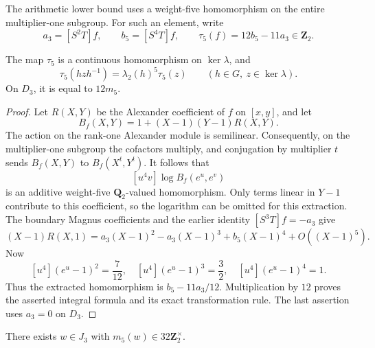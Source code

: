 The arithmetic lower bound uses a weight-five homomorphism on
the entire multiplier-one subgroup.  For such an element, write
\[
 a_3=[S^2T]f,\qquad b_5=[S^4T]f,
 \qquad \tau_5(f)=12b_5-11a_3\in\mathbf Z_2.
\]

\begin{lemma}\label{lem:tau-five}
The map $\tau_5$ is a continuous homomorphism on $\ker\lambda$,
and
\[
 \tau_5(hzh^{-1})=\lambda_2(h)^5\tau_5(z)
 \qquad(h\in G,\ z\in\ker\lambda).
\]
On $D_3$, it is equal to $12m_5$.
\end{lemma}

\begin{proof}
Let $R(X,Y)$ be the Alexander coefficient of $f$ on $[x,y]$,
and let
\[
 B_f(X,Y)=1+(X-1)(Y-1)R(X,Y).
\]
The action on the rank-one Alexander module is semilinear.
Consequently, on the multiplier-one subgroup the cofactors
multiply, and conjugation by multiplier $t$ sends $B_f(X,Y)$
to $B_f(X^t,Y^t)$.  It follows that
\[
 [u^4v]\log B_f(e^u,e^v)
\]
is an additive weight-five $\mathbf Q_2$-valued homomorphism.
Only terms linear in $Y-1$ contribute to this coefficient, so
the logarithm can be omitted for this extraction.  The boundary
Magnus coefficients and the earlier identity $[S^3T]f=-a_3$ give
\[
 (X-1)R(X,1)
 =a_3(X-1)^2-a_3(X-1)^3+b_5(X-1)^4+O((X-1)^5).
\]
Now
\[
 [u^4](e^u-1)^2=\frac7{12},\quad
 [u^4](e^u-1)^3=\frac32,\quad
 [u^4](e^u-1)^4=1.
\]
Thus the extracted homomorphism is $b_5-11a_3/12$.
Multiplication by $12$ proves the asserted integral formula
and its exact transformation rule.  The last assertion uses
$a_3=0$ on $D_3$.
\end{proof}

\begin{proposition}\label{prop:weight-five-arithmetic-generator}
There exists $w\in J_3$ with $m_5(w)\in32\mathbf Z_2^\times$.
\end{proposition}

